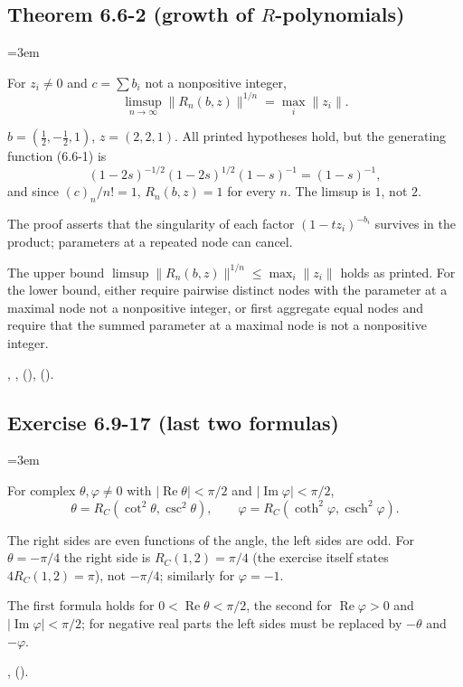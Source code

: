 \documentclass[11pt,a4paper]{article}
\newcommand{\entry}[1]{\par\addvspace{1.5ex}\needspace{5\baselineskip}%
  \subsection{#1}}
\newenvironment{fields}{\begin{description}[font=\normalfont\itshape,
  leftmargin=1.5em, labelindent=0pt, itemsep=0.4ex, topsep=0.3ex, parsep=0.3ex]%
  \setlength{\parindent}{0pt}\RaggedRight\emergencystretch=3em}{\end{description}}
\newcommand{\Real}{\operatorname{Re}}
\newcommand{\Imag}{\operatorname{Im}}
\newcommand{\RC}{R_C}
\DeclareMathOperator{\csch}{csch}
\begin{document}
\entry{Theorem 6.6-2 (growth of $R$-polynomials)}
\begin{fields}
\item[As printed] For $z_i\ne0$ and $c=\sum b_i$ not a nonpositive integer,
  \[
    \limsup_{n\to\infty}\lVert R_n(b,z)\rVert^{1/n}=\max_i\lVert z_i\rVert .
  \]
\item[Counterexample] $b=(\tfrac12,-\tfrac12,1)$, $z=(2,2,1)$. All printed hypotheses hold,
  but the generating function (6.6-1) is
  \[
    (1-2s)^{-1/2}(1-2s)^{1/2}(1-s)^{-1}=(1-s)^{-1},
  \]
  and since $(c)_n/n!=1$, $R_n(b,z)=1$ for every $n$. The limsup is $1$, not $2$.
\item[Cause] The proof asserts that the singularity of each factor $(1-tz_i)^{-b_i}$ survives
  in the product; parameters at a repeated node can cancel.
\item[Correction] The upper bound $\limsup\lVert R_n(b,z)\rVert^{1/n}\le\max_i\lVert z_i\rVert$
  holds as printed. For the lower bound, either require pairwise distinct nodes with the
  parameter at a maximal node not a nonpositive integer, or first aggregate equal nodes and
  require that the summed parameter at a maximal node is not a nonpositive integer.
\item[Lean] ,
  ,
   (),
  ().
\end{fields}

\entry{Exercise 6.9-17 (last two formulas)}
\begin{fields}
\item[As stated] For complex $\theta,\varphi\ne0$ with $\lvert\Real\theta\rvert<\pi/2$ and
  $\lvert\Imag\varphi\rvert<\pi/2$,
  \[
    \theta=\RC(\cot^2\theta,\csc^2\theta),\qquad
    \varphi=\RC(\coth^2\varphi,\csch^2\varphi).
  \]
\item[Counterexample] The right sides are even functions of the angle, the left sides are odd.
  For $\theta=-\pi/4$ the right side is $\RC(1,2)=\pi/4$ (the exercise itself states
  $4\RC(1,2)=\pi$), not $-\pi/4$; similarly for $\varphi=-1$.
\item[Correction] The first formula holds for $0<\Real\theta<\pi/2$, the second for
  $\Real\varphi>0$ and $\lvert\Imag\varphi\rvert<\pi/2$; for negative real parts the left sides
  must be replaced by $-\theta$ and $-\varphi$.
\item[Lean] ,
  ().
\end{fields}
\end{document}
